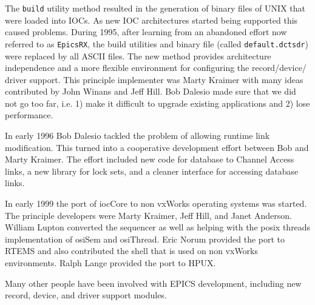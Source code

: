 The \verb|build| utility method resulted in the generation of binary files of UNIX that were loaded into IOCs. As new IOC 
architectures started being supported this caused problems. During 1995, after learning from an abandoned effort now 
referred to as \verb|EpicsRX|, the build utilities and binary file (called \verb|default.dctsdr|) were replaced by all ASCII files. 
The new method provides architecture independence and a more flexible environment for configuring the record/device/
driver support. This principle implementer was Marty Kraimer with many ideas contributed by John Winans and Jeff Hill. 
Bob Dalesio made sure that we did not go too far, i.e. 1) make it difficult to upgrade existing applications and 2) lose 
performance.

In early 1996 Bob Dalesio tackled the problem of allowing runtime link modification. This turned into a cooperative 
development effort between Bob and Marty Kraimer. The effort included new code for database to Channel Access links, 
a new library for lock sets, and a cleaner interface for accessing database links.

In early 1999 the port of iocCore to non vxWorks operating systems was started. The principle developers were Marty 
Kraimer, Jeff Hill, and Janet Anderson. William Lupton converted the sequencer as well as helping with the posix threads 
implementation of osiSem and osiThread. Eric Norum provided the port to RTEMS and also contributed the shell that is 
used on non vxWorks environments. Ralph Lange provided the port to HPUX.

Many other people have been involved with EPICS development, including new record, device, and driver support 
modules.
